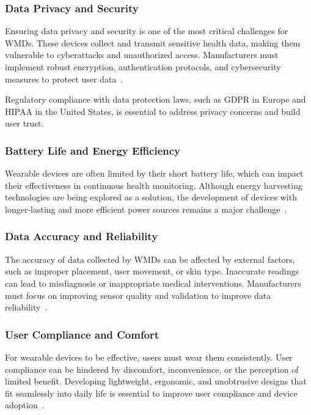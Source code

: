 \documentclass[journal]{IEEEtran}
\begin{document}
        \subsubsection{Data Privacy and Security}

        Ensuring data privacy and security is one of the most critical challenges for WMDs. These devices collect and transmit sensitive health data, making them vulnerable to cyberattacks and unauthorized access. Manufacturers must implement robust encryption, authentication protocols, and cybersecurity measures to protect user data~\cite{Iqbal2016}.

        Regulatory compliance with data protection laws, such as GDPR in Europe and HIPAA in the United States, is essential to address privacy concerns and build user trust.

        \subsubsection{Battery Life and Energy Efficiency}

        Wearable devices are often limited by their short battery life, which can impact their effectiveness in continuous health monitoring. Although energy harvesting technologies are being explored as a solution, the development of devices with longer-lasting and more efficient power sources remains a major challenge~\cite{Ates2022,Gao2024}.

        \subsubsection{Data Accuracy and Reliability}

        The accuracy of data collected by WMDs can be affected by external factors, such as improper placement, user movement, or skin type. Inaccurate readings can lead to misdiagnosis or inappropriate medical interventions. Manufacturers must focus on improving sensor quality and validation to improve data reliability~\cite{Lu2020, Babu2024}.

        \subsubsection{User Compliance and Comfort}

        For wearable devices to be effective, users must wear them consistently. User compliance can be hindered by discomfort, inconvenience, or the perception of limited benefit. Developing lightweight, ergonomic, and unobtrusive designs that fit seamlessly into daily life is essential to improve user compliance and device adoption~\cite{Luo2024, Hindelang2024}.
\end{document}

